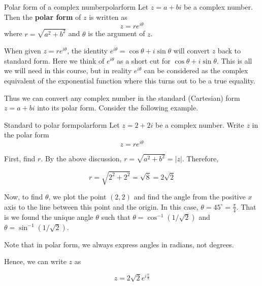 \begin{definition}{Polar form of a complex number}{polarform}
Let $z = a + bi$ be a complex number. Then the \textbf{polar form} of $z$ is written as 
\[
z = re^{i\theta}
\]
where $r = \sqrt{a^2 + b^2}$ and $\theta$ is the argument of $z$. 
\end{definition}

When given $z = re^{i\theta}$, the identity $e^{i\theta} = \cos\theta + i \sin\theta$ will convert $z$ back to standard form. Here we think of $ e^{i \theta}$ as a short cut for $ \cos \theta
+i\sin \theta$. This is all we will need in this course, but in
reality $e^{i \theta}$ can be considered as the complex equivalent of
the exponential function where this turns out to be a true equality.

\begin{center}
\end{center}

Thus we can convert any complex number in the standard (Cartesian) form $z = a+bi$
into its polar form. Consider the following example.

\begin{example}{Standard to polar form}{polarform}
Let $z = 2 + 2i$ be a complex number. 
Write $z$ in the polar form 
\begin{equation*}
z = re^{i \theta}
\end{equation*}
\end{example}

\begin{solution}
First, find $r$.
By the above discussion, $r=\sqrt{
a^{2}+b^{2}} = |z|$. Therefore,

\begin{equation*}
r = \sqrt{2^{2} + 2^{2}} = \sqrt{8} =2\sqrt{2}
\end{equation*}

Now, to find $\theta$, we plot the point $\left( 2, 2 \right)$ and
find the angle from the positive $x$ axis to the line between this
point and the origin. In this case, $\theta = 45^{\circ} =
\frac{\pi}{4}$.  That is we found the unique angle $\theta$ such that 
$\theta = \cos^{-1}(1/\sqrt{2})$ and $\theta = \sin^{-1}(1/\sqrt{2})$. 

Note that in polar form, we always express angles in radians, not degrees.

Hence, we can write $z$ as

\begin{equation*}
z = 2\sqrt{2} e^{i\frac{\pi}{4}}
\end{equation*}

\end{solution}

